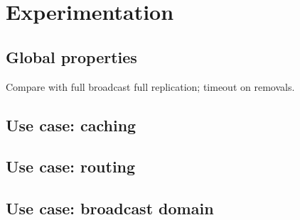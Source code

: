 
\section{Experimentation}
\label{sec:experimentation}

\subsection{Global properties}

Compare with full broadcast full replication; timeout on removals.

\subsection{Use case: caching}

\subsection{Use case: routing}

\subsection{Use case: broadcast domain}

\subsection{}

